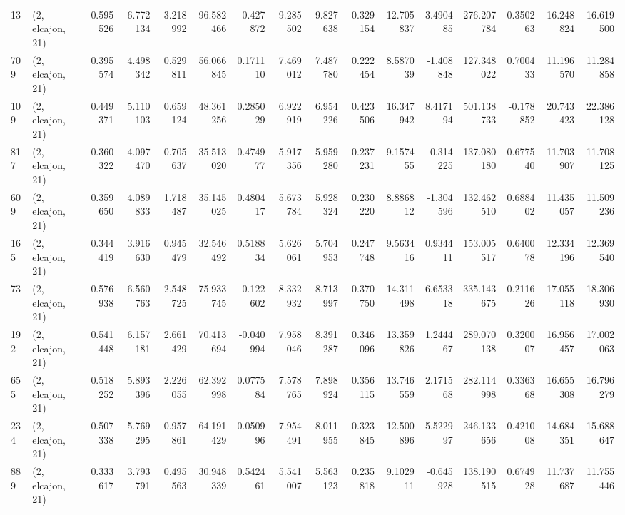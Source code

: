 \begin{tabular}{llrrrrrrrrrrrrrr}
13   &  (2, elcajon, 21) &   0.595526 &   6.772134 &   3.218992 &     96.582466 &   -0.427872 &    9.285502 &    9.827638 &  0.329154 &  12.705837 &   3.490485 &   276.207784 &   0.350263 &  16.248824 &  16.619500 \\
709  &  (2, elcajon, 21) &   0.395574 &   4.498342 &   0.529811 &     56.066845 &    0.171110 &    7.469012 &    7.487780 &  0.222454 &   8.587039 &  -1.408848 &   127.348022 &   0.700433 &  11.196570 &  11.284858 \\
109  &  (2, elcajon, 21) &   0.449371 &   5.110103 &   0.659124 &     48.361256 &    0.285029 &    6.922919 &    6.954226 &  0.423506 &  16.347942 &   8.417194 &   501.138733 &  -0.178852 &  20.743423 &  22.386128 \\
817  &  (2, elcajon, 21) &   0.360322 &   4.097470 &   0.705637 &     35.513020 &    0.474977 &    5.917356 &    5.959280 &  0.237231 &   9.157455 &  -0.314225 &   137.080180 &   0.677540 &  11.703907 &  11.708125 \\
609  &  (2, elcajon, 21) &   0.359650 &   4.089833 &   1.718487 &     35.145025 &    0.480417 &    5.673784 &    5.928324 &  0.230220 &   8.886812 &  -1.304596 &   132.462510 &   0.688402 &  11.435057 &  11.509236 \\
165  &  (2, elcajon, 21) &   0.344419 &   3.916630 &   0.945479 &     32.546492 &    0.518834 &    5.626061 &    5.704953 &  0.247748 &   9.563416 &   0.934411 &   153.005517 &   0.640078 &  12.334196 &  12.369540 \\
73   &  (2, elcajon, 21) &   0.576938 &   6.560763 &   2.548725 &     75.933745 &   -0.122602 &    8.332932 &    8.713997 &  0.370750 &  14.311498 &   6.653318 &   335.143675 &   0.211626 &  17.055118 &  18.306930 \\
192  &  (2, elcajon, 21) &   0.541448 &   6.157181 &   2.661429 &     70.413694 &   -0.040994 &    7.958046 &    8.391287 &  0.346096 &  13.359826 &   1.244467 &   289.070138 &   0.320007 &  16.956457 &  17.002063 \\
655  &  (2, elcajon, 21) &   0.518252 &   5.893396 &   2.226055 &     62.392998 &    0.077584 &    7.578765 &    7.898924 &  0.356115 &  13.746559 &   2.171568 &   282.114998 &   0.336368 &  16.655308 &  16.796279 \\
234  &  (2, elcajon, 21) &   0.507338 &   5.769295 &   0.957861 &     64.191429 &    0.050996 &    7.954491 &    8.011955 &  0.323845 &  12.500896 &   5.522997 &   246.133656 &   0.421008 &  14.684351 &  15.688647 \\
889  &  (2, elcajon, 21) &   0.333617 &   3.793791 &   0.495563 &     30.948339 &    0.542461 &    5.541007 &    5.563123 &  0.235818 &   9.102911 &  -0.645928 &   138.190515 &   0.674928 &  11.737687 &  11.755446 \\

\end{tabular}
